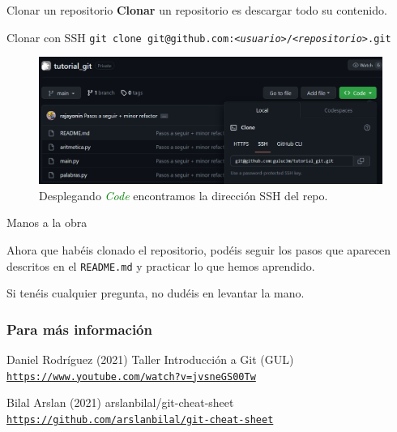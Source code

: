 \documentclass[11pt]{beamer}
\begin{document}
\begin{frame}{Clonar un repositorio}
	\textbf{Clonar} un repositorio es descargar todo su contenido.

    \begin{block}{Clonar con SSH}
        \texttt{git clone git@github.com:\textit{<usuario>}/\textit{<repositorio>}.git}
    \end{block}

    \begin{figure}
        \centering
        \includegraphics[width=0.8\linewidth]{clone.png}
        \caption{Desplegando \textcolor{green}{\textit{Code}} encontramos la dirección SSH del repo.}
        \label{fig:enter-label}
    \end{figure}
    
\end{frame}


\begin{frame}{Manos a la obra}
	
    Ahora que habéis clonado el repositorio, podéis seguir los pasos que aparecen descritos en el \texttt{README.md} y practicar lo que hemos aprendido.

    \bigskip

    Si tenéis cualquier pregunta, no dudéis en levantar la mano.
 
\end{frame}


\begin{frame} %
	\frametitle{Para más información}
	
	\begin{thebibliography}{99} %
		\footnotesize %
		
			Daniel Rodríguez (2021)
			\newblock Taller Introducción a Git (GUL)
            \newblock \href{https://www.youtube.com/watch?v=jvsneGS00Tw&t=791s}{\texttt{https://www.youtube.com/watch?v=jvsneGS00Tw}}
			
			Bilal Arslan (2021)
			\newblock arslanbilal/git-cheat-sheet
			\newblock \href{https://github.com/arslanbilal/git-cheat-sheet}{\texttt{https://github.com/arslanbilal/git-cheat-sheet}}
	\end{thebibliography}
\end{frame}

\end{document}
